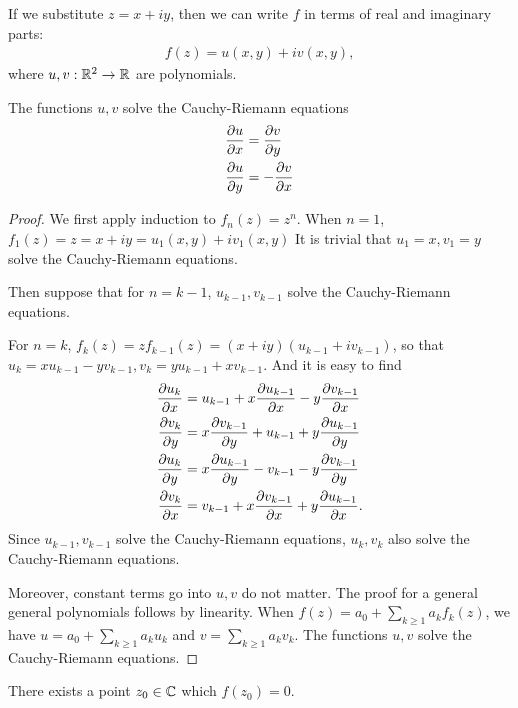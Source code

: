 If we substitute $z = x + iy$, then we can write $f$ in terms of real and imaginary parts:
\begin{align}
f(z) = u(x,y) + i v(x,y),
\end{align}
where $u, v : \mathbb{R}^2 \to \mathbb{R}$ are polynomials.

\begin{lemma}
The functions $u, v$ solve the Cauchy-Riemann equations
\begin{align}
\frac{\partial u}{\partial x} &= \frac{\partial v}{\partial y} \\
\frac{\partial u}{\partial y} &= -\frac{\partial v}{\partial x}
\end{align}
\end{lemma}

\begin{proof}
We first apply induction to $f_n(z) = z^n$.
When $n=1$, $f_1(z) = z = x + iy = u_1(x,y) + iv_1(x,y)$
It is trivial that $u_1 = x, v_1 = y$ solve the Cauchy-Riemann equations.

Then suppose that for $n=k-1$, $u_{k-1}, v_{k-1}$ solve the Cauchy-Riemann equations.

For $n = k$, $f_k(z) = z f_{k-1}(z) = (x+iy)(u_{k-1}+iv_{k-1})$, so that $u_k = xu_{k-1} - yv_{k-1}, v_k = yu_{k-1} + xv_{k-1}$.
And it is easy to find 
\begin{align}
\frac{\partial u_k}{\partial x} &= u_{k-1} + x \frac{\partial u_{k-1}}{\partial x} - y \frac{\partial v_{k-1}}{\partial x} \\
\frac{\partial v_k}{\partial y} &= x \frac{\partial v_{k-1}}{\partial y} + u_{k-1} + y \frac{\partial u_{k-1}}{\partial y} \\
\frac{\partial u_k}{\partial y} &= x \frac{\partial u_{k-1}}{\partial y} - v_{k-1} - y \frac{\partial v_{k-1}}{\partial y} \\
\frac{\partial v_k}{\partial x} &= v_{k-1} + x \frac{\partial v_{k-1}}{\partial x} + y \frac{\partial u_{k-1}}{\partial x}.
\end{align}
Since $u_{k-1}, v_{k-1}$ solve the Cauchy-Riemann equations, $u_{k}, v_{k}$ also solve the Cauchy-Riemann equations.

Moreover, constant terms go into $u,v$ do not matter.
The proof for a general general polynomials follows by linearity.
When $f(z)=a_0 + \sum_{k \ge 1} a_k f_k(z)$, we have $u= a_0 + \sum_{k \ge 1} a_k u_k$ and $v = \sum_{k \ge 1} a_k v_k$.
The functions $u, v$ solve the Cauchy-Riemann equations.
\end{proof}

\begin{theorem}
There exists a point $z_0 \in \mathbb{C}$ which $f(z_0) = 0$.
\end{theorem}

